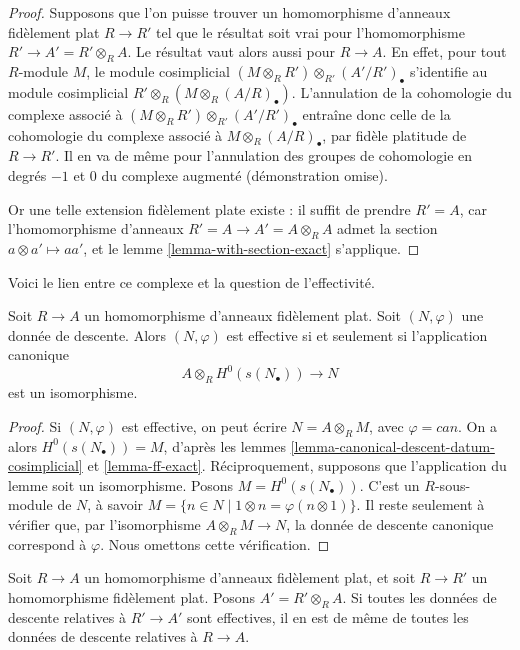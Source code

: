 \begin{proof}
Supposons que l'on puisse trouver un homomorphisme d'anneaux fidèlement plat
$R \to R'$ tel que le résultat soit vrai pour l'homomorphisme
$R' \to A' = R' \otimes_R A$. Le résultat vaut alors aussi pour $R \to A$.
En effet, pour tout $R$-module $M$, le module cosimplicial
$(M \otimes_R R') \otimes_{R'} (A'/R')_\bullet$
s'identifie au module cosimplicial $R' \otimes_R (M \otimes_R (A/R)_\bullet)$.
L'annulation de la cohomologie du complexe associé à
$(M \otimes_R R') \otimes_{R'} (A'/R')_\bullet$ entraîne donc celle
de la cohomologie du complexe associé à
$M \otimes_R (A/R)_\bullet$, par fidèle platitude de $R \to R'$.
Il en va de même pour l'annulation des groupes de cohomologie en degrés
$-1$ et $0$ du complexe augmenté (démonstration omise).

\medskip\noindent
Or une telle extension fidèlement plate existe : il suffit de prendre $R' = A$,
car l'homomorphisme d'anneaux $R' = A \to A' = A \otimes_R A$ admet la section
$a \otimes a' \mapsto aa'$, et le
lemme \ref{lemma-with-section-exact} s'applique.
\end{proof}

\noindent
Voici le lien entre ce complexe et la question de l'effectivité.

\begin{lemma}
\label{lemma-recognize-effective}
Soit $R \to A$ un homomorphisme d'anneaux fidèlement plat.
Soit $(N, \varphi)$ une donnée de descente.
Alors $(N, \varphi)$ est effective si et seulement si l'application canonique
$$
A \otimes_R H^0(s(N_\bullet)) \longrightarrow N
$$
est un isomorphisme.
\end{lemma}

\begin{proof}
Si $(N, \varphi)$ est effective, on peut écrire $N = A \otimes_R M$,
avec $\varphi = can$. On a alors $H^0(s(N_\bullet)) = M$, d'après
les lemmes \ref{lemma-canonical-descent-datum-cosimplicial}
et \ref{lemma-ff-exact}. Réciproquement, supposons que l'application du lemme
soit un isomorphisme. Posons $M = H^0(s(N_\bullet))$.
C'est un $R$-sous-module de $N$,
à savoir $M = \{n \in N \mid 1 \otimes n = \varphi(n \otimes 1)\}$.
Il reste seulement à vérifier que, par l'isomorphisme
$A \otimes_R M \to N$,
la donnée de descente canonique correspond à $\varphi$.
Nous omettons cette vérification.
\end{proof}

\begin{lemma}
\label{lemma-descent-descends}
Soit $R \to A$ un homomorphisme d'anneaux fidèlement plat, et soit $R \to R'$
un homomorphisme fidèlement plat. Posons $A' = R' \otimes_R A$.
Si toutes les données de descente relatives à $R' \to A'$ sont effectives,
il en est de même de toutes les données de descente relatives à $R \to A$.
\end{lemma}

